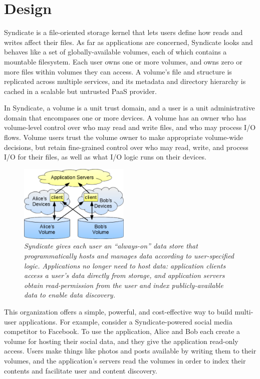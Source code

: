 \section{Design}
\label{sec:design}

Syndicate is a file-oriented storage kernel that lets users define how reads and
writes affect their files.  As far as applications are concerned, Syndicate looks
and behaves like a set of globally-available volumes, each of which contains a
mountable filesystem. Each user owns one or more volumes, and owns zero or more
files within volumes they can access.  A volume's file and structure is replicated across
multiple services, and its metadata and directory hierarchy is cached in a
scalable but untrusted PaaS provider.

In Syndicate, a volume is a unit trust domain, and a user is a unit
administrative domain that encompases one or more devices.  A volume has an
owner who has volume-level control over who may read and write files, and who
may process I/O flows. Volume users trust the volume owner to make appropriate
volume-wide decisions, but retain fine-grained control over who may read, write,
and process I/O for their files, as well as what I/O logic runs on their
devices.

\begin{figure}[t!]
\centering
\includegraphics[width=0.47\textwidth]{figures/app-overview}
\caption{\it
Syndicate gives each user an ``always-on'' data store that programmatically
hosts and manages data according to user-specified logic.  Applications no
longer need to host data:  application clients access a user's data directly from storage,
and application servers obtain read-permission from the user and
index publicly-available data to enable data discovery.}
\label{fig:app-overview}
\end{figure}

This organization offers a simple, powerful, and cost-effective way to build multi-user
applications. For example, consider a Syndicate-powered social media competitor
to Facebook. To use the application, Alice and Bob each create a volume for
hosting their social data, and they give the application read-only access. Users
make things like photos and posts available by writing them to their volumes,
and the application's servers read the volumes in order to index their
contents and facilitate user and content discovery.

